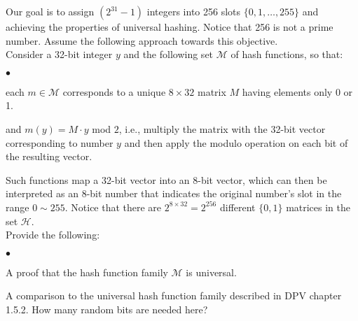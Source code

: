 \documentclass{article}
\newenvironment{myitem}{\begin{list}{$\bullet$}
{\setlength{\itemsep}{-0pt}
\setlength{\topsep}{0pt}
\setlength{\labelwidth}{0pt}
\setlength{\leftmargin}{10pt}
\setlength{\parsep}{-0pt}
\setlength{\itemsep}{0pt}
\setlength{\partopsep}{0pt}}}%
{\end{list}}
\begin{document}
 Our goal is to assign $(2^{31}-1)$ integers
into 256 slots $\{0,1, \dots, 255\}$ and achieving the properties of
universal hashing. Notice that 256 is not a prime number. Assume the
following approach towards this objective.\\

\noindent Consider a 32-bit integer $y$ and the following set $\mathcal{M}$ of
hash functions, so that:
\begin{myitem}
\item each $m \in \mathcal{M}$ corresponds to a unique $8 \times 32$
  matrix $M$ having elements only 0 or 1.
\item and $m(y) = M \cdot y$ mod $2$, i.e., multiply the matrix with
  the 32-bit vector corresponding to number $y$ and then apply the
  modulo operation on each bit of the resulting vector.\\
\end{myitem}

\noindent Such functions map a 32-bit vector into an 8-bit vector,
which can then be interpreted as an 8-bit number that indicates the
original number's slot in the range $0 \sim 255$. Notice that there
are $2^{8\times32}=2^{256}$ different $\{0,1\}$ matrices in the set
$\mathcal{H}$.\\

\noindent Provide the following:
\begin{myitem}
\item A proof that the hash function family $\mathcal{M}$ is
  universal.

\item A comparison to the universal hash function family described in
  DPV chapter 1.5.2. How many random bits are needed here?\\
\end{myitem}

\newpage
\end{document}
